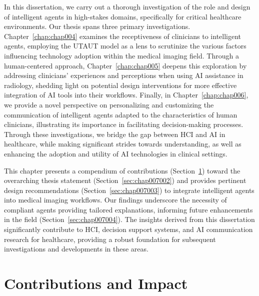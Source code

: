 \clearpage
\label{chap:chap007}

In this dissertation, we carry out a thorough investigation of the role and design of intelligent agents in high-stakes domains, specifically for critical healthcare environments.
Our thesis spans three primary investigations.
Chapter~\ref{chap:chap004} examines the receptiveness of clinicians to intelligent agents, employing the \ac{UTAUT} model as a lens to scrutinize the various factors influencing technology adoption within the medical imaging field.
Through a human-centered approach, Chapter~\ref{chap:chap005} deepens this exploration by addressing clinicians' experiences and perceptions when using \ac{AI} assistance in radiology, shedding light on potential design interventions for more effective integration of \ac{AI} tools into their workflows.
Finally, in Chapter~\ref{chap:chap006}, we provide a novel perspective on personalizing and customizing the communication of intelligent agents adapted to the characteristics of human clinicians, illustrating its importance in facilitating decision-making processes.
Through these investigations, we bridge the gap between \ac{HCI} and \ac{AI} in healthcare, while making significant strides towards understanding, as well as enhancing the adoption and utility of \ac{AI} technologies in clinical settings.

This chapter presents a compendium of contributions (Section~\ref{sec:chap007001}) toward the overarching thesis statement (Section~\ref{sec:chap007002}) and provides pertinent design recommendations (Section~\ref{sec:chap007003}) to integrate intelligent agents into medical imaging workflows.
Our findings underscore the necessity of compliant agents providing tailored explanations, informing future enhancements in the field (Section~\ref{sec:chap007004}).
The insights derived from this dissertation significantly contribute to \ac{HCI}, decision support systems, and \ac{AI} communication research for healthcare, providing a robust foundation for subsequent investigations and developments in these areas.

\section{Contributions and Impact}
\label{sec:chap007001}

